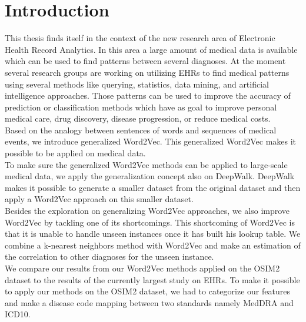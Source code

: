 \chapter{Introduction}
\label{cha:introduction}

This thesis finds itself in the context of the new research area of Electronic Health Record Analytics. In this area a large amount of medical data is available which can be used to find patterns between several diagnoses. At the moment several research groups are working on utilizing EHRs to find medical patterns using several methods like querying, statistics, data mining, and artificial intelligence approaches. Those patterns can be used to improve the accuracy of prediction or classification methods which have as goal to improve personal medical care, drug discovery, disease progression, or reduce medical costs. \\

Based on the analogy between sentences of words and sequences of medical events, we introduce generalized Word2Vec. This generalized Word2Vec makes it possible to be applied on medical data. \\
To make sure the generalized Word2Vec methods can be applied to large-scale medical data, we apply the generalization concept also on DeepWalk. DeepWalk makes it possible to generate a smaller dataset from the original dataset and then apply a Word2Vec approach on this smaller dataset. \\
Besides the exploration on generalizing Word2Vec approaches, we also improve Word2Vec by tackling one of its shortcomings. This shortcoming of Word2Vec is that it is unable to handle unseen instances once it has built his lookup table. We combine a k-nearest neighbors method with Word2Vec and make an estimation of the correlation to other diagnoses for the unseen instance. \\

We compare our results from our Word2Vec methods applied on the OSIM2 dataset to the results of the currently largest study on EHRs. To make it possible to apply our methods on the OSIM2 dataset, we had to categorize our features and make a disease code mapping between two standards namely MedDRA and ICD10. 

